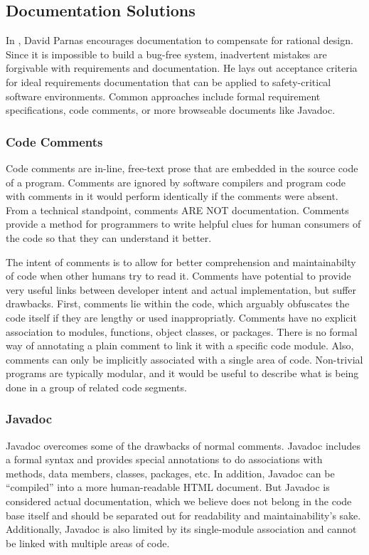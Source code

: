 \subsection{Documentation Solutions}

In \cite{Parnas1986}, David Parnas encourages documentation to compensate for
rational design. Since it is impossible to build a bug-free system, inadvertent
mistakes are forgivable with requirements and documentation. He lays out
acceptance criteria for ideal requirements documentation that can be applied to
safety-critical software environments. Common approaches include formal
requirement specifications, code comments, or more browseable documents like
Javadoc\cite{Javadoc}.

\subsubsection*{Code Comments}
Code comments are in-line, free-text prose that are embedded in the source code
of a program. Comments are ignored by software compilers and program code with
comments in it would perform identically if the comments were absent. From a
technical standpoint, comments ARE NOT documentation. Comments provide a method
for programmers to write helpful clues for human consumers of the code so that
they can understand it better.

The intent of comments is to allow for better comprehension and maintainabilty
of code when other humans try to read it. Comments have potential to provide
very useful links between developer intent and actual implementation, but suffer
drawbacks. First, comments lie within the code, which arguably obfuscates the
code itself if they are lengthy or used inappropriatly. Comments have no
explicit association to modules, functions, object classes, or packages. There
is no formal way of annotating a plain comment to link it with a specific code
module. Also, comments can only be implicitly associated with a single area
of code. Non-trivial programs are typically modular, and it would be useful to
describe what is being done in a group of related code segments.

\subsubsection*{Javadoc}
Javadoc overcomes some of the drawbacks of normal comments. Javadoc includes a
formal syntax and provides special annotations to do associations with methods,
data members, classes, packages, etc. In addition, Javadoc can be ``compiled''
into a more human-readable HTML document. But Javadoc is considered actual
documentation, which we believe does not belong in the code base itself and
should be separated out for readability and maintainability's sake.
Additionally, Javadoc is also limited by its single-module association and
cannot be linked with multiple areas of code.


